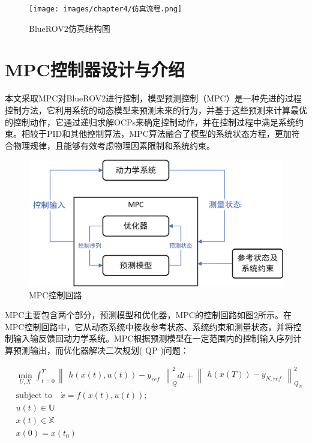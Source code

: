 \begin{figure}[hbt]
    \centering
    \texttt{[image: images/chapter4/仿真流程.png]}
    \caption{BlueROV2仿真结构图}
    \label{f.simulation_framework}
\end{figure}

\section{MPC控制器设计与介绍}
本文采取MPC对BlueROV2进行控制，模型预测控制（MPC）是一种先进的过程控制方法，它利用系统的动态模型来预测未来的行为，并基于这些预测来计算最优的控制动作，它通过递归求解OCPs来确定控制动作，并在控制过程中满足系统约束。相较于PID和其他控制算法，MPC算法融合了模型的系统状态方程，更加符合物理规律，且能够有效考虑物理因素限制和系统约束。\cite{huDisturbanceObserverBasedModel2024}

\begin{figure}[hbt]
    \centering
    \includegraphics[width=0.8\linewidth]{images/chapter4/MPC控制闭环图.png}
    \caption{MPC控制回路}
    \label{f.MPC_control_loop}
\end{figure}

MPC主要包含两个部分，预测模型和优化器，MPC的控制回路如图\ref{f.MPC_control_loop}所示。在MPC控制回路中，它从动态系统中接收参考状态、系统约束和测量状态，并将控制输入输反馈回动力学系统。MPC根据预测模型在一定范围内的控制输入序列计算预测输出，而优化器解决二次规划( QP )问题：

\begin{equation}
\begin{aligned}
 & \min_{U,X}\int_{t=0}^T 
 \begin{Vmatrix}
     h(x(t),u(t))-y_{ref}
 \end{Vmatrix}_Q^2dt +
  \begin{Vmatrix}
     h(x(T))-y_{N,ref}
 \end{Vmatrix}_{Q_N}^2
 \\
& \text{subject to} \quad \dot{x}=f(x(t),u(t)); \\
& u(t) \in \mathbb{U} \\
& x(t) \in \mathbb{X} \\
& x(0) = x(t_0)
\end{aligned}
\end{equation}

